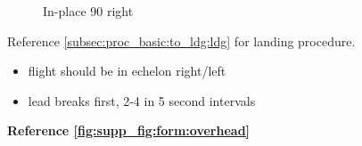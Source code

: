 \begin{figure}[htbp]
\begin{minipage}[b]{0.5\textwidth}
        \caption{In-place 90 right}
        \label{fig:supp_fig:form:inplace}
    \end{minipage}
\end{figure}

\begin{tcoloritemize}
    Reference \cref{subsec:proc_basic:to_ldg:ldg} for landing procedure.
    \begin{itemize}
        \item flight should be in echelon right/left
        \item lead breaks first, 2-4 in 5 second intervals 
    \end{itemize}
    \hfill\textbf{Reference \cref{fig:supp_fig:form:overhead}}
\end{tcoloritemize}

